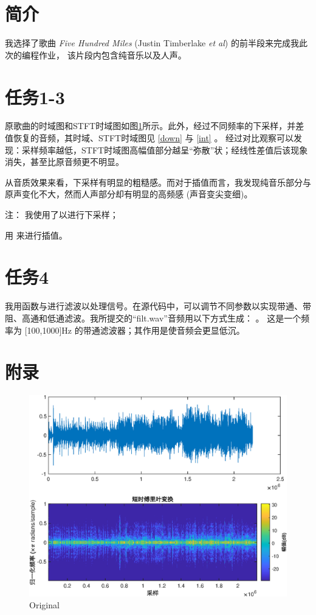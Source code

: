 \documentclass[fontset=macnew]{article}
\begin{document}
\section{简介}
我选择了歌曲 \textit{Five Hundred Miles} (Justin Timberlake \textit{et al}) 的前半段来完成我此次的编程作业，
该片段内包含纯音乐以及人声。

\section{任务1-3}
原歌曲的时域图和STFT时域图如图\ref{origin}所示。此外，经过不同频率的下采样，并差值恢复的音频，其时域、STFT时域图见 \ref{down} 与 \ref{int} 。
经过对比观察可以发现：采样频率越低，STFT时域图高幅值部分越呈“弥散”状；经线性差值后该现象消失，甚至比原音频更不明显。

从音质效果来看，下采样有明显的粗糙感。而对于插值而言，我发现纯音乐部分与原声变化不大，然而人声部分却有明显的高频感 (声音变尖变细)。

注：
我使用了以进行下采样；

用   来进行插值。

\section{任务4}
我用函数与进行滤波以处理信号。在源代码中，可以调节不同参数以实现带通、带阻、高通和低通滤波。我所提交的“filt.wav”音频用以下方式生成：
。
这是一个频率为 [100,1000]Hz 的带通滤波器；其作用是使音频会更显低沉。

\section{附录}
\begin{figure}[htbp]
	\centering
	\includegraphics[width=0.55\linewidth]{origin.eps}
	\caption{Original}
	\label{origin}
\end{figure}
\end{document}
